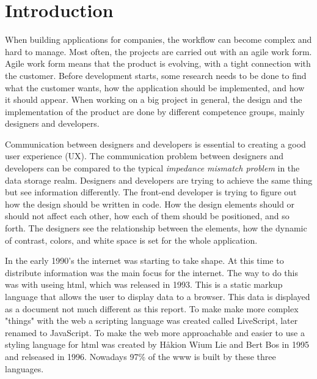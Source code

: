 \section{Introduction}




When building applications for companies, the workflow can become complex and hard to manage. Most often, the projects are carried out with an agile work form\cite{cohen2004introduction}. Agile work form means that the product is evolving, with a tight connection with the customer. Before development starts, some research needs to be done to find what the customer wants, how the application should be implemented, and how it should appear. When working on a big project in general, the design and the implementation of the product are done by different competence groups, mainly designers and developers. 

Communication between designers and developers is essential to creating a good user experience (UX). The communication problem between designers and developers can be compared to the typical \textit{impedance mismatch problem} in the data storage realm. Designers and developers are trying to achieve the same thing but see information differently. The front-end developer is trying to figure out how the design should be written in code. How the design elements should or should not affect each other, how each of them should be positioned, and so forth. The designers see the relationship between the elements, how the dynamic of contrast, colors, and white space is set for the whole application. 

In the early 1990's the internet was starting to take shape\cite{WebD2BriefHistory}. At this time to distribute information was the main focus for the internet. The way to do this was with useing \acrfull{html}, which was released in 1993\cite{WebD2BriefHistory}. This is a static markup language that allows the user to display data to a browser. This data is displayed as a document not much different as this report. To make make more complex "things" with the web a scripting language was created called LiveScript, later renamed to JavaScript\cite{JavaScript2021}. To make the web more approachable and easier to use a styling language for \acrshort{html} was created by Håkion Wium Lie and Bert Bos in 1995 and relseased in 1996\cite{BriefHistoryCSS}. Nowadays 97\% of the \acrlong{www} is built by these three languages\cite{JavaScript2021}.


